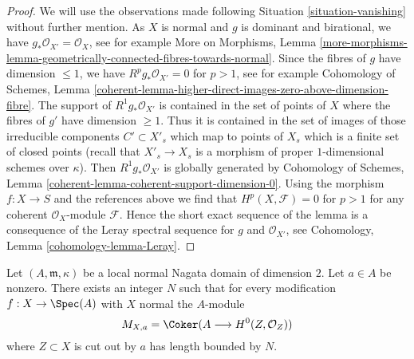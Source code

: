 \begin{proof}
We will use the observations made following Situation \ref{situation-vanishing}
without further mention. As $X$ is normal and $g$ is dominant and
birational, we have $g_*\mathcal{O}_{X'} = \mathcal{O}_X$, see for
example More on Morphisms, Lemma
\ref{more-morphisms-lemma-geometrically-connected-fibres-towards-normal}.
Since the fibres of $g$ have dimension $\leq 1$, we have
$R^pg_*\mathcal{O}_{X'} = 0$ for $p > 1$, see for example
Cohomology of Schemes, Lemma
\ref{coherent-lemma-higher-direct-images-zero-above-dimension-fibre}.
The support of $R^1g_*\mathcal{O}_{X'}$ is contained in the set of points of
$X$ where the fibres of $g'$ have dimension $\geq 1$. Thus
it is contained in the set of images of those
irreducible components $C' \subset X'_s$ which map to points of $X_s$
which is a finite set of closed points
(recall that $X'_s \to X_s$ is a morphism of proper $1$-dimensional
schemes over $\kappa$). Then $R^1g_*\mathcal{O}_{X'}$ is globally
generated by
Cohomology of Schemes, Lemma \ref{coherent-lemma-coherent-support-dimension-0}.
Using the morphism $f : X \to S$ and the references above we find that
$H^p(X, \mathcal{F}) = 0$ for $p > 1$ for any coherent $\mathcal{O}_X$-module
$\mathcal{F}$. Hence the short exact sequence of the lemma is a consequence
of the Leray spectral sequence for $g$ and $\mathcal{O}_{X'}$, see
Cohomology, Lemma \ref{cohomology-lemma-Leray}.
\end{proof}

\begin{lemma}
\label{lemma-bound-a-torsion}
Let $(A, \mathfrak m, \kappa)$ be a local normal Nagata domain
of dimension $2$. Let $a \in A$ be nonzero. There exists an integer $N$ such
that for every modification $f : X \to \Spec(A)$ with $X$ normal the
$A$-module
$$
M_{X, a} = \Coker(A \longrightarrow H^0(Z, \mathcal{O}_Z))
$$
where $Z \subset X$ is cut out by $a$ has length bounded by $N$.
\end{lemma}

